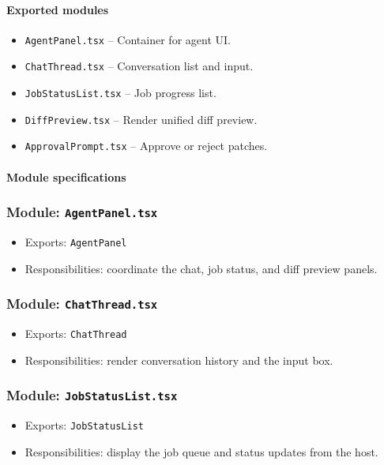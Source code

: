 \documentclass[11pt]{article}
\begin{document}
\paragraph{Exported modules}
\begin{itemize}[noitemsep]
  \item \texttt{AgentPanel.tsx} -- Container for agent UI.
  \item \texttt{ChatThread.tsx} -- Conversation list and input.
  \item \texttt{JobStatusList.tsx} -- Job progress list.
  \item \texttt{DiffPreview.tsx} -- Render unified diff preview.
  \item \texttt{ApprovalPrompt.tsx} -- Approve or reject patches.
\end{itemize}

\paragraph{Module specifications}
\subsubsection*{Module: \texttt{AgentPanel.tsx}}
\begin{itemize}[noitemsep]
  \item Exports: \texttt{AgentPanel}
  \item Responsibilities: coordinate the chat, job status, and diff preview panels.
\end{itemize}

\subsubsection*{Module: \texttt{ChatThread.tsx}}
\begin{itemize}[noitemsep]
  \item Exports: \texttt{ChatThread}
  \item Responsibilities: render conversation history and the input box.
\end{itemize}

\subsubsection*{Module: \texttt{JobStatusList.tsx}}
\begin{itemize}[noitemsep]
  \item Exports: \texttt{JobStatusList}
  \item Responsibilities: display the job queue and status updates from the host.
\end{itemize}
\end{document}
